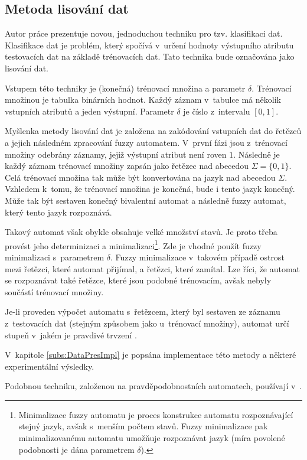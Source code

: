 \subsection{Metoda lisování dat} \label{subs:DataPresTech}

Autor práce prezentuje novou, jednoduchou techniku pro tzv. klasifikaci dat. Klasifikace dat je problém, který spočívá v~určení hodnoty výstupního atributu testovacích dat na základě trénovacích dat. Tato technika bude označována jako lisování dat.

Vstupem této techniky je (konečná) trénovací množina a parametr $\delta$. Trénovací množinou je tabulka binárních hodnot. Každý záznam v~tabulce má několik vstupních atributů a jeden výstupní. Parametr $\delta$ je číslo z~intervalu $[0,1]$.

Myšlenka metody lisování dat je založena na zakódování vstupních dat do řetězců a jejich následném zpracování fuzzy automatem. V~první fázi jsou z~trénovací množiny odebrány záznamy, jejiž výstupní atribut není roven $1$. Následně je každý záznam trénovací množiny zapsán jako řetězec nad abecedou $\Sigma = \{ 0, 1 \}$. Celá trénovací množina tak může být konvertována na jazyk nad abecedou $\Sigma$. Vzhledem k~tomu, že trénovací množina je konečná, bude i tento jazyk konečný. Může tak být sestaven konečný bivalentní automat a následně fuzzy automat, který tento jazyk rozpoznává.

Takový automat však obykle obsahuje velké množství stavů. Je proto třeba provést jeho determinizaci a minimalizaci\footnote{Minimalizace fuzzy automatu je proces konstrukce automatu rozpoznávající stejný jazyk, avšak s~menším počtem stavů. Fuzzy minimalizace pak minimalizovanému automatu umožňuje rozpoznávat jazyk  (míra povolené podobnosti je dána parametrem $\delta$).}. Zde je vhodné použít fuzzy minimalizaci s~parametrem $\delta$. Fuzzy minimalizace v~takovém případě  ostrost mezi řetězci, které automat přijímal, a řetězci, které zamítal. Lze říci, že automat se  rozpoznávat také řetězce, které jsou podobné trénovacím, avšak nebyly součástí trénovací množiny.

Je-li proveden výpočet automatu s~řetězcem, který byl sestaven ze záznamu z~testovacích dat (stejným způsobem jako u~trénovací množiny), automat určí stupeň v~jakém je pravdivé trvzení .

V~kapitole \ref{subs:DataPresImpl} je popsána implementace této metody a některé experimentální výsledky.
\begin{note}
  Podobnou techniku, založenou na pravděpodobnostních automatech, používají v~\cite{Hac+-ProAnaLarFinStaMac}.
\end{note}


